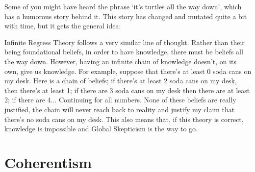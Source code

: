 Some of you might have heard the phrase `it's turtles all the way down', which has a humorous story behind it.  This story has changed and mutated quite a bit with time, but it gets the general idea:


Infinite Regress Theory follows a very similar line of thought. Rather than their being foundational beliefs, in order to have knowledge, there must be beliefs all the way down.  However, having an infinite chain of knowledge doesn't, on its own, give us knowledge. For example, suppose that there's at least 0 soda cans on my desk. Here is a chain of beliefs; if there's at least 2 soda cans on my desk, then there's at least 1; if there are 3 soda cans on my desk then there are at least 2; if there are 4... Continuing for all numbers. None of these beliefs are really justified,  the chain will never reach back to reality and justify my claim that there's no soda cans on my desk. This also means that, if this theory is correct, knowledge is impossible and Global Skepticism is the way to go. 

\section{Coherentism}

